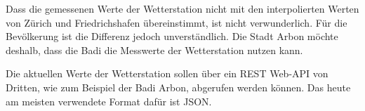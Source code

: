 \noindent
Dass die gemessenen Werte der Wetterstation nicht mit den interpolierten Werten von Zürich und Friedrichshafen übereinstimmt, ist nicht verwunderlich. Für die Bevölkerung ist die Differenz jedoch unverständlich. Die Stadt Arbon möchte deshalb, dass die Badi die Messwerte der Wetterstation nutzen kann.
\newline

\noindent
Die aktuellen Werte der Wetterstation sollen über ein REST Web-API von Dritten, wie zum Beispiel der Badi Arbon, abgerufen werden können. Das heute am meisten verwendete Format dafür ist JSON.

